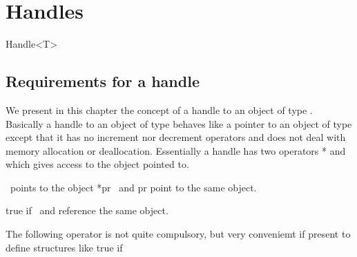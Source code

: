 
\chapter{Handles} \label{I1_ChapterPointer}


\begin{ccClassTemplate}{Handle<T>}
\section{Requirements for a handle}

We present in this chapter the concept of a handle to an object
of type . Basically a handle to an object of type 
behaves like a pointer to an object of type  except that it has
no increment nor decrement operators and does not deal with memory
allocation or deallocation. Essentially a
 handle has two operators
* and \ccc{->} which gives  access to the object pointed to.
 


\ccTypes


\ccCreation
{}
\ccThreeToTwo

\ccGlue
{}
\ccGlue
{}

 {\ccVar\ points to the object *pr}
\ccGlue
{} {\ccVar\ and pr point
to the same object.}
\ccGlue


\ccGlue
{}




{}
{true if \ccVar\ and  reference the same object.}
\ccGlue
{}

The following operator is not quite compulsory, but very conveniemt if 
present to define structures like 
 {true if 
}

\end{ccClassTemplate} 

